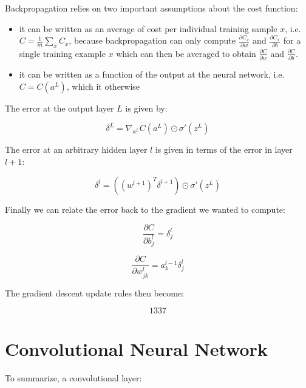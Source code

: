 Backpropagation relies on two important assumptions about the cost function:

\begin{itemize}
    \item it can be written as an average of cost per individual training sample $x$, i.e. $C = \frac{1}{m} \sum_x C_x$, because backpropagation can only compute $\frac{\partial C_x}{\partial w}$  and $\frac{\partial C_x}{\partial b}$ for a single training example $x$ which can then be averaged to obtain $\frac{\partial C}{\partial w}$  and $\frac{\partial C}{\partial b}$.
    \item it can be written as a function of the output at the neural network, i.e. $C = C(a^{L})$, which it otherwise
\end{itemize}


The error at the output layer $L$ is given by:

$$
\delta^L = \nabla_{a^L} C(a^L) \odot \sigma'(z^L)
$$

The error at an arbitrary hidden layer $l$ is given in terms of the error in layer $l+1$:

$$
\delta^l = ((w^{l+1})^T \delta^{l+1}) \odot \sigma'(z^L)
$$

Finally we can relate the error back to the gradient we wanted to compute:

$$
\frac{\partial C}{\partial b^l_j} = \delta^l_j
$$

$$
\frac{\partial C}{\partial w^l_{jk}} = a^{l-1}_k \delta^l_j
$$

The gradient descent update rules then become:

$$
1337
$$

\section{Convolutional Neural Network}

To summarize, a convolutional layer:

